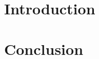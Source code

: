 \documentclass[12pt]{cmuthesis}
\begin{document}
\chapter{Introduction}
\chapter{Conclusion}

%

\backmatter


\renewcommand{\bibsection}{\chapter{\bibname}}

\end{document}
